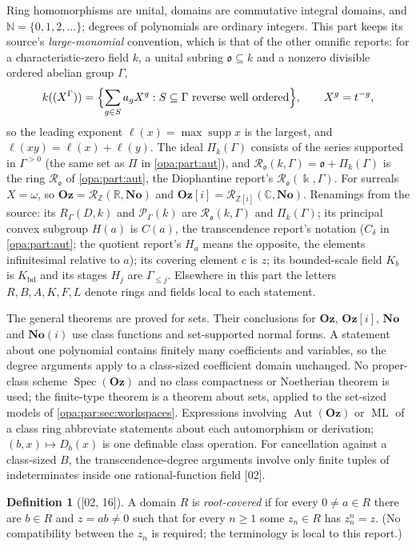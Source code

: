 \documentclass[11pt,oneside]{article}
\numberwithin{equation}{section}
\theoremstyle{definition}
\newtheorem{definition}[definition]{Definition}
\theoremstyle{remark}
\newcommand{\No}{\mathbf{No}}
\newcommand{\Oz}{\mathbf{Oz}}
\newcommand{\Og}{\mathbf{Oz}[i]}
\newcommand{\SC}{\mathbf{No}(i)}
\newcommand{\R}{\mathbb R}
\newcommand{\C}{\mathbb C}
\newcommand{\Z}{\mathbb Z}
\newcommand{\N}{\mathbb N}
\newcommand{\oo}{\mathfrak o}
\newcommand{\Ro}{\mathcal R_{\oo}}
\newcommand{\Aut}{\operatorname{Aut}}
\newcommand{\supp}{\operatorname{supp}}
\newcommand{\ML}{\operatorname{ML}}
\newcommand{\src}[1]{\textup{\textsf{\small[#1]}}}
\begin{document}
Ring homomorphisms are unital, domains are commutative integral domains, and
$\N=\{0,1,2,\dots\}$; degrees of polynomials are ordinary integers. This part keeps
its source's \emph{large-monomial} convention, which is that of the other omnific
reports: for a characteristic-zero field $k$, a unital subring $\oo\subseteq k$ and a
nonzero divisible ordered abelian group $\Gamma$,
\[
 k((X^\Gamma))=\Bigl\{\sum_{g\in S}a_gX^g:S\subseteq\Gamma\text{ reverse well ordered}\Bigr\},
 \qquad X^g=t^{-g},
\]
so the leading exponent $\ell(x)=\max\supp x$ is the largest, and
$\ell(xy)=\ell(x)+\ell(y)$. The ideal $\Pi_k(\Gamma)$ consists of the series supported
in $\Gamma^{>0}$ (the same set as $\Pi$ in \cref{opa:part:aut}), and
$\mathcal R_\oo(k,\Gamma)=\oo+\Pi_k(\Gamma)$ is the ring $\Ro$ of \cref{opa:part:aut},
the Diophantine report's $\mathcal R_\oo(\Bbbk,\Gamma)$. For surreals $X=\omega$, so
$\Oz=\mathcal R_\Z(\R,\No)$ and $\Og=\mathcal R_{\Z[i]}(\C,\No)$. Renamings from the
source: its $R_\Gamma(D,k)$ and $\mathcal P_\Gamma(k)$ are
$\mathcal R_\oo(k,\Gamma)$ and $\Pi_k(\Gamma)$; its principal convex subgroup $H(a)$ is
$C(a)$, the transcendence report's notation ($C_\delta$ in \cref{opa:part:aut}; the
quotient report's $H_a$ means the opposite, the elements infinitesimal relative to
$a$); its covering element $c$ is
$z$; its bounded-scale field $K_b$ is $K_{\mathrm{bd}}$ and its stages $H_j$ are
$\Gamma_{\le j}$. Elsewhere in this part the letters $R,B,A,K,F,L$ denote rings and
fields local to each statement.

The general theorems are proved for sets. Their conclusions for $\Oz$, $\Og$, $\No$
and $\SC$ use class functions and set-supported normal forms. A statement about one
polynomial contains finitely many coefficients and variables, so the degree
arguments apply to a class-sized coefficient domain unchanged. No proper-class
scheme $\operatorname{Spec}(\Oz)$ and no class compactness or Noetherian theorem is
used; the finite-type theorem is a theorem about sets, applied to the set-sized
models of \cref{opa:par:sec:workspaces}. Expressions involving $\Aut(\Oz)$ or
$\ML$ of a class ring abbreviate statements about each automorphism or derivation;
$(b,x)\mapsto D_b(x)$ is one definable class operation. For cancellation against a
class-sized $B$, the transcendence-degree arguments involve only finite tuples of
indeterminates inside one rational-function field \src{02}.

\begin{definition}[\src{02, 16}]\label{opa:par:def:rootcover}
A domain $R$ is \emph{root-covered} if for every $0\ne a\in R$ there are $b\in R$ and
$z=ab\ne0$ such that for every $n\ge1$ some $z_n\in R$ has $z_n^n=z$. (No
compatibility between the $z_n$ is required; the terminology is local to this
report.)
\end{definition}
\end{document}
